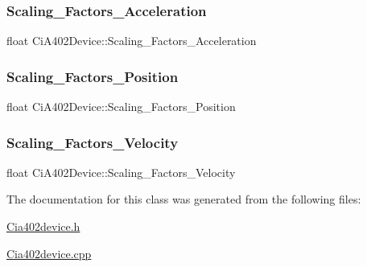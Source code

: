 \subsubsection{\texorpdfstring{Scaling\+\_\+\+Factors\+\_\+\+Acceleration}{Scaling\_Factors\_Acceleration}}
{\footnotesize\ttfamily float Ci\+A402\+Device\+::\+Scaling\+\_\+\+Factors\+\_\+\+Acceleration\hspace{0.3cm}{\ttfamily [private]}}

\mbox{\label{classCiA402Device_af6df63ddd2ddc1953f847855436ef129}} 
\subsubsection{\texorpdfstring{Scaling\+\_\+\+Factors\+\_\+\+Position}{Scaling\_Factors\_Position}}
{\footnotesize\ttfamily float Ci\+A402\+Device\+::\+Scaling\+\_\+\+Factors\+\_\+\+Position\hspace{0.3cm}{\ttfamily [private]}}

\mbox{\label{classCiA402Device_a57db6ccb730d3c26b7b33000d371b3bf}} 
\subsubsection{\texorpdfstring{Scaling\+\_\+\+Factors\+\_\+\+Velocity}{Scaling\_Factors\_Velocity}}
{\footnotesize\ttfamily float Ci\+A402\+Device\+::\+Scaling\+\_\+\+Factors\+\_\+\+Velocity\hspace{0.3cm}{\ttfamily [private]}}



The documentation for this class was generated from the following files\+:\begin{DoxyCompactItemize}
\item 
\hyperlink{Cia402device_8h}{Cia402device.\+h}\item 
\hyperlink{Cia402device_8cpp}{Cia402device.\+cpp}\end{DoxyCompactItemize}
